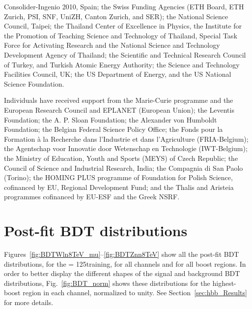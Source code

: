 \documentclass[12pt,twoside,a4paper,cmspaper,final,collab]{cms-tdr}
\begin{document}
Consolider-Ingenio 2010, Spain; the Swiss Funding Agencies (ETH Board, ETH Zurich, PSI, SNF, UniZH, Canton Zurich, and SER); the National Science Council, Taipei; the Thailand Center of Excellence in Physics, the Institute for the Promotion of Teaching Science and Technology of Thailand, Special Task Force for Activating Research and the National Science and Technology Development Agency of Thailand; the Scientific and Technical Research Council of Turkey, and Turkish Atomic Energy Authority; the Science and Technology Facilities Council, UK; the US Department of Energy, and the US National Science Foundation.

Individuals have received support from the Marie-Curie programme and the European Research Council and EPLANET (European Union); the Leventis Foundation; the A. P. Sloan Foundation; the Alexander von Humboldt Foundation; the Belgian Federal Science Policy Office; the Fonds pour la Formation \`a la Recherche dans l'Industrie et dans l'Agriculture (FRIA-Belgium); the Agentschap voor Innovatie door Wetenschap en Technologie (IWT-Belgium); the Ministry of Education, Youth and Sports (MEYS) of Czech Republic; the Council of Science and Industrial Research, India; the Compagnia di San Paolo (Torino); the HOMING PLUS programme of Foundation for Polish Science, cofinanced by EU, Regional Development Fund; and the Thalis and Aristeia programmes cofinanced by EU-ESF and the Greek NSRF.



\appendix

\section{Post-fit BDT distributions}\label{sec:hbb_Appendix}


Figures~\ref{fig:BDTWln8TeV_mu}--\ref{fig:BDTZnn8TeV} show all the post-fit
BDT distributions, for the  \mH = 125\GeV training, for all channels
and for all boost regions. In order to better display the
different shapes of the signal and background BDT distributions, Fig.~\ref{fig:BDT_norm} shows these
distributions for the highest-boost region in each
channel, normalized to unity. See Section~\ref{sec:hbb_Results} for more details.
\end{document}
